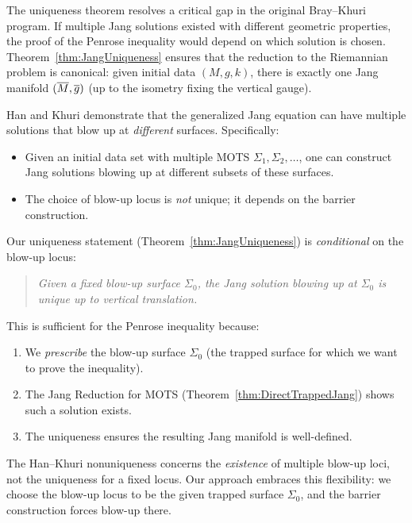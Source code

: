 \begin{remark}
The uniqueness theorem resolves a critical gap in the original Bray--Khuri program. If multiple Jang solutions existed with different geometric properties, the proof of the Penrose inequality would depend on which solution is chosen. Theorem~\ref{thm:JangUniqueness} ensures that the reduction to the Riemannian problem is canonical: given initial data $(M, g, k)$, there is exactly one Jang manifold $(\overline{M}, \overline{g})$ (up to the isometry fixing the vertical gauge).
\end{remark}

\begin{remark}\label{rem:HanKhuriNonuniqueness}
Han and Khuri \cite{hankhuri2013} demonstrate that the generalized Jang equation can have multiple solutions that blow up at \emph{different} surfaces. Specifically:
\begin{itemize}
    \item Given an initial data set with multiple MOTS $\Sigma_1, \Sigma_2, \ldots$, one can construct Jang solutions blowing up at different subsets of these surfaces.
    \item The choice of blow-up locus is \emph{not} unique; it depends on the barrier construction.
\end{itemize}

Our uniqueness statement (Theorem~\ref{thm:JangUniqueness}) is \emph{conditional} on the blow-up locus:
\begin{quote}
\textit{Given a fixed blow-up surface $\Sigma_0$, the Jang solution blowing up at $\Sigma_0$ is unique up to vertical translation.}
\end{quote}

This is sufficient for the Penrose inequality because:
\begin{enumerate}
    \item We \emph{prescribe} the blow-up surface $\Sigma_0$ (the trapped surface for which we want to prove the inequality).
    \item The Jang Reduction for MOTS (Theorem~\ref{thm:DirectTrappedJang}) shows such a solution exists.
    \item The uniqueness ensures the resulting Jang manifold is well-defined.
\end{enumerate}

The Han--Khuri nonuniqueness concerns the \emph{existence} of multiple blow-up loci, not the uniqueness for a fixed locus. Our approach embraces this flexibility: we choose the blow-up locus to be the given trapped surface $\Sigma_0$, and the barrier construction forces blow-up there.
\end{remark}

